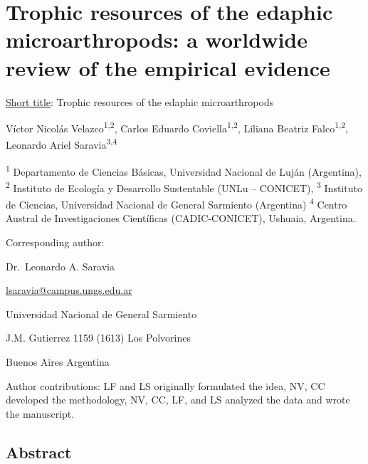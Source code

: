 \documentclass[11pt]{article}
\begin{document}
\vfill

\clearpage
\linenumbers
\pagestyle{normal}

\hypertarget{trophic-resources-of-the-edaphic-microarthropods-a-worldwide-review-of-the-empirical-evidence}{%
\section{Trophic resources of the edaphic microarthropods: a worldwide
review of the empirical
evidence}\label{trophic-resources-of-the-edaphic-microarthropods-a-worldwide-review-of-the-empirical-evidence}}

\underline{Short title}: Trophic resources of the edaphic
microarthropods

Víctor Nicolás Velazco\textsuperscript{1,2}, Carlos Eduardo
Coviella\textsuperscript{1,2}, Liliana Beatriz
Falco\textsuperscript{1,2}, Leonardo Ariel Saravia\textsuperscript{3,4}

\textsuperscript{1} Departamento de Ciencias Básicas, Universidad
Nacional de Luján (Argentina), \textsuperscript{2} Instituto de Ecología
y Desarrollo Sustentable (UNLu -- CONICET), \textsuperscript{3}
Instituto de Ciencias, Universidad Nacional de General Sarmiento
(Argentina) \textsuperscript{4} Centro Austral de Investigaciones
Científicas (CADIC-CONICET), Ushuaia, Argentina.

Corresponding author:

Dr.~Leonardo A. Saravia

\underline{lsaravia@campus.ungs.edu.ar}

Universidad Nacional de General Sarmiento

J.M. Gutierrez 1159 (1613) Los Polvorines

Buenos Aires Argentina

Author contributions: LF and LS originally formulated the idea, NV, CC
developed the methodology, NV, CC, LF, and LS analyzed the data and
wrote the manuscript.

\hypertarget{abstract}{%
\subsection{Abstract}\label{abstract}}
\end{document}
